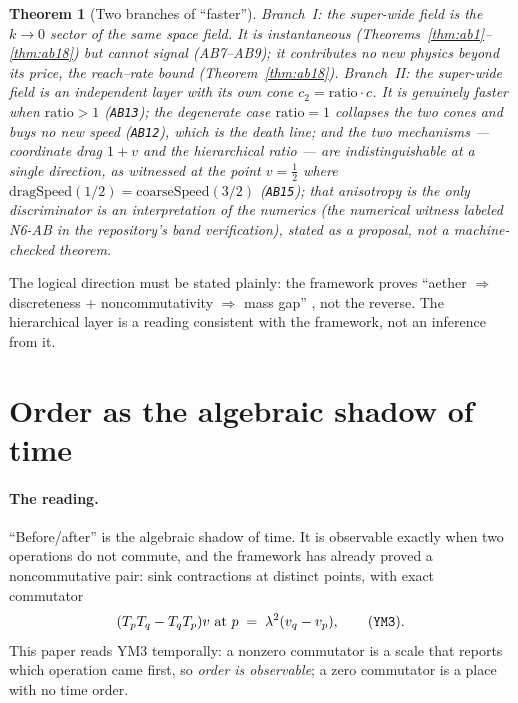 \documentclass[aps,prd,preprint,superscriptaddress,amsmath,amssymb]{revtex4-2}
\newtheorem{theorem}{Theorem}[section]
\begin{document}
\begin{theorem}[Two branches of ``faster'']
\label{thm:branches}
Branch~I: the super-wide field is the $k\to0$ sector of the same
space field.  It is instantaneous (Theorems~\ref{thm:ab1}--\ref{thm:ab18})
but cannot signal (AB7--AB9); it contributes no new physics beyond
its price, the reach--rate bound
(Theorem~\ref{thm:ab18}).  Branch~II: the super-wide field is an
independent layer with its own cone $c_2=\mathrm{ratio}\cdot c$.  It
is genuinely faster when $\mathrm{ratio}>1$ (\texttt{AB13}); the
degenerate case $\mathrm{ratio}=1$ collapses the two cones and buys no
new speed (\texttt{AB12}), which is the death line; and the two
mechanisms --- coordinate drag $1+v$ and the hierarchical ratio ---
are indistinguishable at a single direction, as witnessed at the
point $v=\tfrac12$ where $\mathrm{dragSpeed}(1/2)=
\mathrm{coarseSpeed}(3/2)$ (\texttt{AB15}); that anisotropy is the
only discriminator is an interpretation of the numerics
(the numerical witness labeled N6-AB in the repository's band
verification), stated as a proposal, not a machine-checked theorem.
\end{theorem}

The logical direction must be stated plainly: the framework proves
``aether $\Rightarrow$ discreteness + noncommutativity $\Rightarrow$
mass gap'' \cite{morningstar1999glueball,chen2006glueball,besiii2026lightest}, not the reverse.  The hierarchical layer is a reading
consistent with the framework, not an inference from it.

\section{Order as the algebraic shadow of time}
\label{sec:order}

\paragraph{The reading.}
``Before/after'' is the algebraic shadow of time.  It is observable
exactly when two operations do not commute, and the framework has
already proved a noncommutative pair: sink contractions at distinct
points, with exact commutator
\begin{equation}
(T_pT_q-T_qT_p)v \text{ at } p \;=\; \lambda^2(v_q-v_p),
\qquad \text{(\texttt{YM3})}.
\end{equation}
This paper reads YM3 temporally: a nonzero commutator is a scale that
reports which operation came first, so \emph{order is observable};
a zero commutator is a place with no time order.
\end{document}
